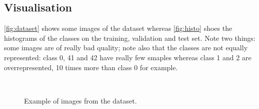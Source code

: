 \documentclass{article}
\begin{document}
\subsection{Visualisation}
\autoref{fig:dataset} shows some images of the dataset whereas \autoref{fig:histo} shoes the histograms of the classes on the training, validation and test set. Note two things: some images are of really bad quality; note also that the classes are not equally represented: class 0, 41 and 42 have really few smaples whereas class 1 and 2 are overrepresented, 10 times more than class 0 for example.
\begin{figure}
\centering
{}\\
\caption{Example of images from the dataset.}
\label{fig:dataset}
\end{figure}
\end{document}
